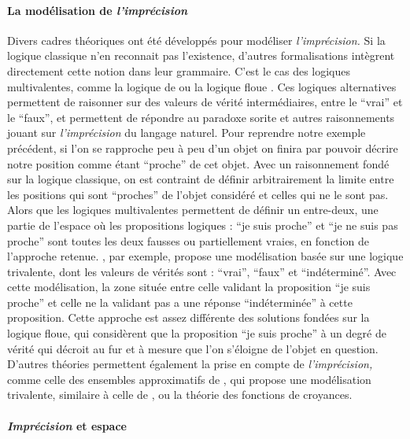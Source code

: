 \paragraph{La modélisation de \emph{l'imprécision}}

Divers cadres théoriques ont été développés pour modéliser
\emph{l'imprécision.} Si la logique classique n'en reconnait pas
l'existence, d'autres formalisations intègrent directement cette
notion dans leur grammaire. C'est le cas des logiques multivalentes,
comme la logique de  ou la logique floue
\autocite{Williamson1994,Sorensen2018}. Ces logiques alternatives
permettent de raisonner sur des valeurs de vérité intermédiaires,
entre le \enquote{vrai} et le \enquote{faux}, et permettent de
répondre au paradoxe sorite et autres raisonnements jouant sur
\emph{l'imprécision} du langage naturel. Pour reprendre notre exemple
précédent, si l'on se rapproche peu à peu d'un objet on finira par
pouvoir décrire notre position comme étant \enquote{proche} de cet
objet. Avec un raisonnement fondé sur la logique classique, on est
contraint de définir arbitrairement la limite entre les positions qui
sont \enquote{proches} de l'objet considéré et celles qui ne le sont
pas. Alors que les logiques multivalentes permettent de définir un
entre-deux, une partie de l'espace où les propositions logiques :
\enquote{je suis proche} et \enquote{je ne suis pas proche} sont
toutes les deux fausses ou partiellement vraies, en fonction de
l'approche retenue. \textcite{Tye1994}, par exemple, propose une
modélisation basée sur une logique trivalente, dont les valeurs de
vérités sont : \enquote{vrai}, \enquote{faux} et
\enquote{indéterminé}. Avec cette modélisation, la zone située entre
celle validant la proposition \enquote{je suis proche} et celle ne la
validant pas a une réponse \enquote{indéterminée} à cette
proposition. Cette approche est assez différente des solutions fondées
sur la logique floue, qui considèrent que la proposition \enquote{je
  suis proche} à un degré de vérité qui décroit au fur et à mesure que
l'on s'éloigne de l'objet en question. D'autres théories permettent
également la prise en compte de \emph{l'imprécision,} comme celle des
ensembles approximatifs de \textcite{Pawlak1982}, qui propose une
modélisation trivalente, similaire à celle de \textcite{Tye1994}
\autocite{Pawlak1997}, ou la théorie des fonctions de croyances.

\paragraph{\emph{Imprécision} et espace}

